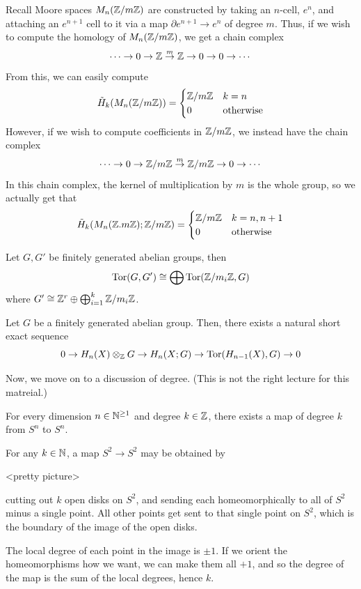 \documentclass[11pt,leqno,oneside]{amsart}
\numberwithin{thm}{section}
\begin{document}
  \begin{example}
    Recall Moore spaces \(M_n({\mathbb Z}/m{\mathbb Z})\) are constructed by taking an
    \(n\)-cell, \(e^n\), and attaching an \(e^{n+1}\) cell to it via a
    map \(\partial e^{n+1} \to e^n\) of degree \(m\). Thus, if we wish
    to compute the homology of \(M_n({\mathbb Z}/m{\mathbb Z})\), we get a chain
    complex \[
      \cdots \to 0 \to {\mathbb Z} \overset{m}{\to} {\mathbb Z} \to 0 \to 0 \to \cdots
    \]
    From this, we can easily compute \[
      \tilde{H}_k(M_n({\mathbb Z}/m{\mathbb Z})) =
      \begin{cases}
        {\mathbb Z}/m{\mathbb Z} & k=n \\
        0 & \text{otherwise}
      \end{cases}
    \]
    However, if we wish to compute coefficients in \({\mathbb Z}/m{\mathbb Z}\), we
    instead have the chain complex \[
      \cdots \to 0 \to {\mathbb Z}/m{\mathbb Z} \overset{m}{\to} {\mathbb Z}/m{\mathbb Z} \to 0 \to \cdots
    \]
    In this chain complex, the kernel of multiplication by \(m\) is
    the whole group, so we actually get that \[
      \tilde{H}_k(M_n({\mathbb Z}.m{\mathbb Z}); {\mathbb Z}/m{\mathbb Z}) =
      \begin{cases}
        {\mathbb Z}/m{\mathbb Z} & k = n,n+1 \\
        0 & \text{otherwise}
      \end{cases}
    \]
  \end{example}
  \begin{defn}
    Let \(G,G'\) be finitely generated abelian groups, then \[
      \operatorname{Tor}(G,G') \mathrel{\cong} \bigoplus \operatorname{Tor}({\mathbb Z}/m_i {\mathbb Z}, G)
    \]
    where \(G' \mathrel{\cong} {\mathbb Z}^r \oplus \bigoplus_{i=1}^k {\mathbb Z}/m_i{\mathbb Z}\).
  \end{defn}
  \begin{thm}
    Let \(G\) be a finitely generated abelian group. Then, there
    exists a natural short exact sequence \[
      0 \to H_n(X) \otimes_{\mathbb Z} G \to H_n(X;G) \to \operatorname{Tor}(H_{n-1}(X),G)
      \to 0
    \]
  \end{thm}
  Now, we move on to a discussion of degree. (This is not the right
  lecture for this matreial.)
\begin{thm}
  For every dimension $n \in {\mathbb N}^{\geq 1}$ and degree $k \in {\mathbb Z}$, there exists a map of degree $k$ from $S^n$ to $S^n$.
\end{thm}
\begin{example}
  For any $k \in {\mathbb N}$, a map $S^2 \to S^2$ may be obtained by

  <pretty picture>

  cutting out $k$ open disks on $S^2$, and sending each homeomorphically to all of $S^2$ minus a single point.  All other points get sent to that single point on $S^2$, which is the boundary of the image of the open disks.

  The local degree of each point in the image is $\pm 1$.  If we orient the homeomorphisms how we want, we can make them all $+1$, and so the degree of the map is the sum of the local degrees, hence $k$.
\end{example}
\end{document}
